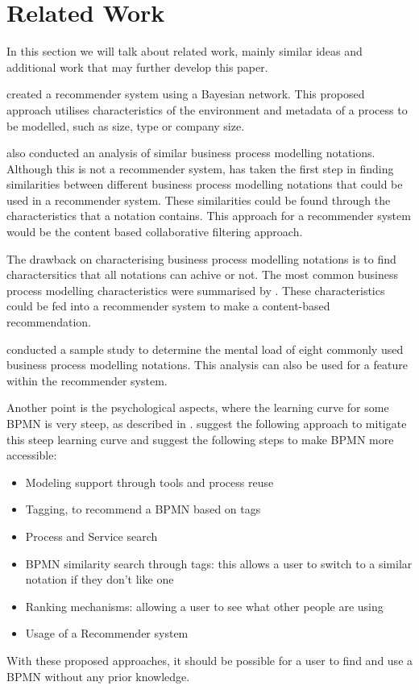 \chapter{Related Work}

\label{chap:related_work}

In this section we will talk about related work, mainly similar ideas and additional work that may further develop this paper.

\cite{recommend_BPM_Baysen} created a recommender system using a Bayesian network. This proposed approach utilises characteristics of the environment and metadata of a process to be modelled, such as size, type or company size. 

\cite{similarity-bpm} also conducted an analysis of similar business process modelling notations. Although this is not a recommender system, \cite{similarity-bpm} has taken the first step in finding similarities between different business process modelling notations that could be used in a recommender system. These similarities could be found through the characteristics that a notation contains. This approach for a recommender system would be the content based collaborative filtering approach.

The drawback on characterising business process modelling notations is to find charactersitics that all notations can achive or not.
The most common business process modelling characteristics were summarised by \cite{bpm_review_framework}. These characteristics could be fed into a recommender system to make a content-based recommendation.

\cite{zimochMentalLoad} conducted a sample study to determine the mental load of eight commonly used business process modelling notations. This analysis can also be used for a feature within the recommender system.

Another point is the psychological aspects, where the learning curve for some BPMN is very steep, as described in \cite{koschmider2011recommendation}. \cite{koschmider2011recommendation} suggest the following approach to mitigate this steep learning curve and suggest the following steps to make BPMN more accessible: 

\begin{itemize}
    \item Modeling support through tools and process reuse
    \item Tagging, to recommend a BPMN based on tags
    \item Process and Service search
    \item BPMN similarity search through tags: this allows a user to switch to a similar notation if they don't like one
    \item Ranking mechanisms: allowing a user to see what other people are using 
    \item Usage of a Recommender system
\end{itemize}

With these proposed approaches, it should be possible for a user to find and use a BPMN without any prior knowledge.